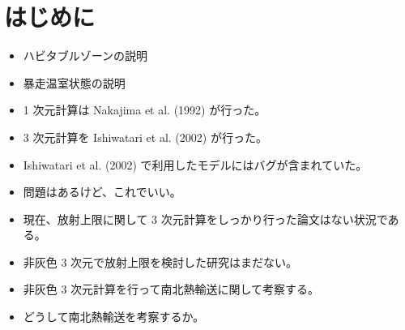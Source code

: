 \documentclass[body]{subfiles}
\begin{document}
\chapter{はじめに}
\begin{itemize}
	\item ハビタブルゾーンの説明
	\item 暴走温室状態の説明
	\item 1 次元計算は Nakajima et al. (1992) が行った。
	\item 3 次元計算を Ishiwatari et al. (2002) が行った。
	\item Ishiwatari et al. (2002) で利用したモデルにはバグが含まれていた。
	\item 問題はあるけど、これでいい。
	\item 現在、放射上限に関して 3 次元計算をしっかり行った論文はない状況である。
	\item 非灰色 3 次元で放射上限を検討した研究はまだない。
	\item 非灰色 3 次元計算を行って南北熱輸送に関して考察する。
	\item どうして南北熱輸送を考察するか。
\end{itemize}
\end{document}
